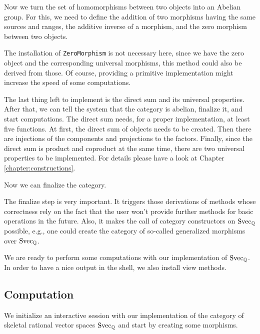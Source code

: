 

Now we turn the set of homomorphisms between two objects into an Abelian group. For this, we need to define the addition of
two morphisms having the same sources and ranges, the additive inverse of a morphism, and the zero morphism between two objects.



The installation of \texttt{ZeroMorphism} is not necessary here, since we have the zero object and the corresponding
universal morphisms, this method could also be derived from those. Of course, providing a primitive implementation might
increase the speed of some computations.

The last thing left to implement is the direct sum and its universal properties. After that, we can tell the system that the
category is abelian, finalize it, and start computations. The direct sum needs, for a proper implementation, at least five
functions. At first, the direct sum of objects needs to be created. Then there are injections of the components and projections
to the factors. Finally, since the direct sum is product and coproduct at the same time, there are two universal properties to be implemented.
For details please have a look at Chapter \ref{chapter:constructions}.



Now we can finalize the category.



The finalize step is very important. It triggers those derivations of methods whose correctness
rely on the fact that the user won't provide further methods for basic operations in the future.
Also, it makes the call of category constructors on $\mathrm{Svec}_{\mathbb{Q}}$ possible, e.g.,
one could create the category of so-called generalized morphisms over $\mathrm{Svec}_{\mathbb{Q}}$.

We are ready to perform some computations with our implementation of $\mathrm{Svec}_{\mathbb{Q}}$.
In order to have a nice output in the \GAP shell, we also install view methods.



\subsection{Computation}\label{subsection:skeletal_vec_computation}

We initialize an interactive session with our implementation of the category of skeletal rational vector spaces $\mathrm{Svec}_{\mathbb{Q}}$
and start by creating some morphisms.

